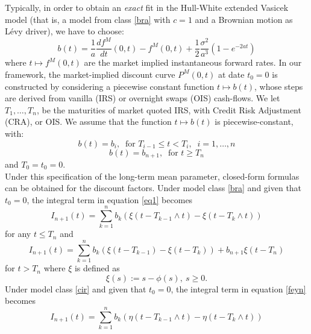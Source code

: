 Typically, in order to obtain an \textit{exact} fit in the Hull-White extended Vasicek model (that is, a model from class \ref{bra} with $c=1$ and a Brownian motion as L\'evy driver), we have to choose:
\begin{equation}
\label{b_equation}
b(t) = \frac{1}{a}\frac{df^M}{dt}(0, t) - f^M(0, t) + \frac{1}{2}\frac{\sigma^2}{a^3}\left( 1 - e^{-2at}\right)
\end{equation}
where $t \mapsto f^M(0, t)$ are the market implied instantaneous forward rates. In our framework, the market-implied discount curve $P^M(0,t)$ at  date $t_{0}=0$ is constructed by considering a piecewise constant function $t \mapsto b(t)$, whose steps are derived from vanilla (IRS) or overnight swaps (OIS) cash-flows.
We let $T_1, \ldots, T_n$, be the maturities of market quoted IRS, with Credit Risk Adjustment (CRA), or OIS. We assume that the function $t \mapsto b(t)$ is piecewise-constant, with:
\medskip
\begin{equation}
\label{bi}
b(t)= b_i,\;\; \mbox{for } T_{i-1} \le t < T_i,\;\;i=1,\ldots,n
\end{equation}
\begin{equation}
\label{b_inf}
b(t)= b_{n+1},\;\; \mbox{for } t \geq T_n
\end{equation}
\medskip
and $T_0 = t_0 = 0$.\\
Under this specification of the long-term mean parameter, closed-form formulas can be obtained for the discount factors. Under model class \ref{bra} and given that $t_{0}=0$, the integral term  in equation \eqref{eq1} becomes 
\begin{equation}
\label{Intb}
I_{n+1}(t) = \sum_{k=1}^n b_k \left( \xi(t - T_{k-1} \wedge t) -  \xi(t - T_k \wedge t) \right)
\end{equation}
\medskip
for any $t \leq T_n$ and
\begin{equation}
\label{Intb}
I_{n+1}(t) = \sum_{k=1}^n b_k \left( \xi(t - T_{k-1}) -  \xi(t - T_k ) \right) + b_{n+1} \xi(t - T_n)
\end{equation}
for $t > T_n$ where $\xi$ is defined as
\begin{equation}
\xi(s) := s - \phi(s), \: s \geq 0.
\end{equation}
Under model class \ref{cir} and given that $t_{0}=0$, the integral term  in equation \eqref{feyn} becomes 
\begin{equation}
\label{Intb}
I_{n+1}(t) = \sum_{k=1}^n b_k \left( \eta(t - T_{k-1} \wedge t) -  \eta(t - T_k \wedge t) \right)
\end{equation}
